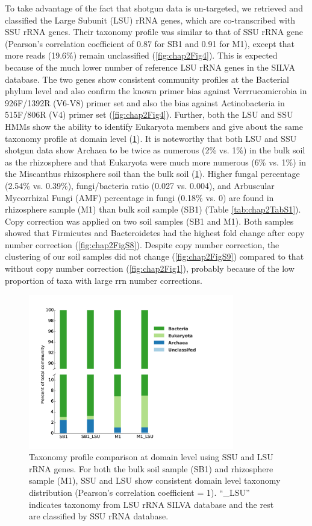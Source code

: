 \documentclass[]{msu-thesis}
\begin{document}
To take advantage of the fact that shotgun data is un-targeted, we retrieved and classified the Large Subunit (LSU) rRNA genes, which are co-transcribed with SSU rRNA genes. Their taxonomy profile was similar to that of SSU rRNA gene (Pearson’s correlation coefficient of 0.87 for SB1 and 0.91 for M1), except that more reads (19.6\%) remain unclassified (\cref{fig:chap2Fig4}). This is expected because of the much lower number of reference LSU rRNA genes in the SILVA database. The two genes show consistent community profiles at the Bacterial phylum level and also confirm the known primer bias against Verrrucomicrobia in 926F/1392R (V6-V8) primer set and also the bias against Actinobacteria in 515F/806R (V4) primer set (\cref{fig:chap2Fig4}). Further, both the LSU and SSU HMMs show the ability to identify Eukaryota members and give about the same taxonomy profile at domain level (\cref{fig:chap2FigS7}). It is noteworthy that both LSU and SSU shotgun data show Archaea to be twice as numerous (2\% vs. 1\%) in the bulk soil as the rhizosphere and that Eukaryota were much more numerous (6\% vs. 1\%) in the Miscanthus rhizosphere soil than the bulk soil (\cref{fig:chap2FigS7}). Higher fungal percentage (2.54\% vs. 0.39\%), fungi/bacteria ratio (0.027 vs. 0.004), and Arbuscular Mycorrhizal Fungi (AMF) percentage in fungi (0.18\% vs. 0) are found in rhizosphere sample (M1) than bulk soil sample (SB1) (Table \ref{tab:chap2TabS1}). Copy correction was applied on two soil samples (SB1 and M1). Both samples showed that Firmicutes and Bacteroidetes had the highest fold change after copy number correction (\cref{fig:chap2FigS8}). Despite copy number correction, the clustering of our soil samples did not change (\cref{fig:chap2FigS9}) compared to that without copy number correction (\cref{fig:chap2Fig1}), probably because of the low proportion of taxa with large rrn number corrections.


\begin{figure}[tbph!]
  \centering
  \includegraphics[width=0.80\textwidth]{figs/chap2_figS7}
  \caption[Taxonomy profile comparison at domain level using SSU and LSU rRNA genes]{Taxonomy profile comparison at domain level using SSU and LSU rRNA genes. For both the bulk soil sample (SB1) and rhizosphere sample (M1), SSU and LSU show consistent domain level taxonomy distribution (Pearson’s correlation coefficient = 1). ``\_LSU'' indicates taxonomy from LSU rRNA SILVA database and the rest are classified by SSU rRNA database.}
  \label{fig:chap2FigS7}
\end{figure}
\end{document}
